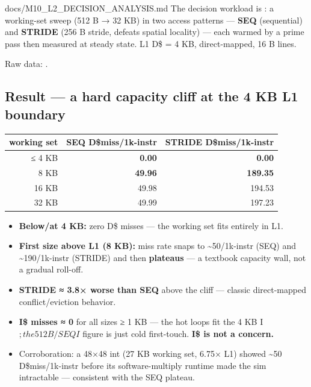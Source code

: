 \begin{relocated}{docs/M10_L2_DECISION_ANALYSIS.md}
The decision workload is : a working-set sweep (512 B → 32
KB) in two access patterns --- \textbf{SEQ} (sequential) and
\textbf{STRIDE} (256 B stride, defeats spatial locality) --- each warmed
by a prime pass then measured at steady state. L1 D\$ = 4 KB,
direct-mapped, 16 B lines.

Raw data: .

\subsection{Result --- a hard capacity cliff at the 4 KB L1 boundary}\label{tm:dec:m10-l2:2-result-a-hard-capacity-cliff-at-the-4-kb-l1-boundary}

{
\begin{longtable}[]{@{}rrr@{}}
\toprule\noalign{}
working set & SEQ D\$miss/\allowbreak{}1k-instr & STRIDE
D\$miss/\allowbreak{}1k-instr \\
\midrule\noalign{}
\endhead
\bottomrule\noalign{}
\endlastfoot
≤ 4 KB & \textbf{0.00} & \textbf{0.00} \\
8 KB & \textbf{49.96} & \textbf{189.35} \\
16 KB & 49.98 & 194.53 \\
32 KB & 49.99 & 197.23 \\
\end{longtable}
}

\begin{itemize}
\tightlist
\item
  \textbf{Below/at 4 KB:} zero D\$ misses --- the working set fits
  entirely in L1.
\item
  \textbf{First size above L1 (8 KB):} miss rate snaps to
  \textasciitilde50/\allowbreak{}1k-instr (SEQ) and
  \textasciitilde190/\allowbreak{}1k-instr (STRIDE) and then
  \textbf{plateaus} --- a textbook capacity wall, not a gradual
  roll-off.
\item
  \textbf{STRIDE ≈ 3.8× worse than SEQ} above the cliff --- classic
  direct-mapped conflict/\allowbreak{}eviction behavior.
\item
  \textbf{I\$ misses ≈ 0} for all sizes ≥ 1 KB --- the hot loops fit the
  4 KB I\(; the
  512 B/SEQ I\) figure is just cold first-touch. \textbf{I\$ is not a
  concern.}
\item
  Corroboration: a 48×48 int  (27 KB working set, 6.75× L1)
  showed \textasciitilde50 D\$miss/\allowbreak{}1k-instr before its
  software-multiply runtime made the sim intractable --- consistent with
  the SEQ plateau.
\end{itemize}


\end{relocated}
